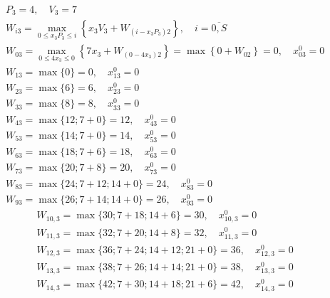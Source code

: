 \begin{align*}
     & P_3 = 4, \quad V_3 = 7                                                                                                                   \\
     & W_{i3} = \max\limits_{0 \leq x_3P_3 \leq i} \left\{x_3V_3 + W_{(i - x_3P_3)2}\right\}, \quad i = \overline{0, S}                         \\
     & W_{03} = \max\limits_{0 \leq 4x_3 \leq 0} \left\{7x_3 + W_{(0 - 4x_3)2}\right\} = \max \left\{0 + W_{02}\right\} = 0, \quad x_{03}^0 = 0 \\
     & W_{13} = \max \{0\} = 0, \quad x_{13}^0 = 0                                                                                              \\
     & W_{23} = \max \{6\} = 6, \quad x_{23}^0 = 0                                                                                              \\
     & W_{33} = \max \{8\} = 8, \quad x_{33}^0 = 0                                                                                              \\
     & W_{43} = \max \{12; 7 + 0\} = 12, \quad x_{43}^0 = 0                                                                                     \\
     & W_{53} = \max \{14; 7 + 0\} = 14, \quad x_{53}^0 = 0                                                                                     \\
     & W_{63} = \max \{18; 7 + 6\} = 18, \quad x_{63}^0 = 0                                                                                     \\
     & W_{73} = \max \{20; 7 + 8\} = 20, \quad x_{73}^0 = 0                                                                                     \\
     & W_{83} = \max \{24; 7 + 12; 14 + 0\} = 24, \quad x_{83}^0 = 0                                                                            \\
     & W_{93} = \max \{26; 7 + 14; 14 + 0\} = 26, \quad x_{93}^0 = 0
\end{align*}
\begin{align*}
     & W_{10, 3} = \max \{30; 7 + 18; 14 + 6\} = 30, \quad x_{10, 3}^0 = 0          \\
     & W_{11, 3} = \max \{32; 7 + 20; 14 + 8\} = 32, \quad x_{11, 3}^0 = 0          \\
     & W_{12, 3} = \max \{36; 7 + 24; 14 + 12; 21 + 0\} = 36, \quad x_{12, 3}^0 = 0 \\
     & W_{13, 3} = \max \{38; 7 + 26; 14 + 14; 21 + 0\} = 38, \quad x_{13, 3}^0 = 0 \\
     & W_{14, 3} = \max \{42; 7 + 30; 14 + 18; 21 + 6\} = 42, \quad x_{14, 3}^0 = 0
\end{align*}

